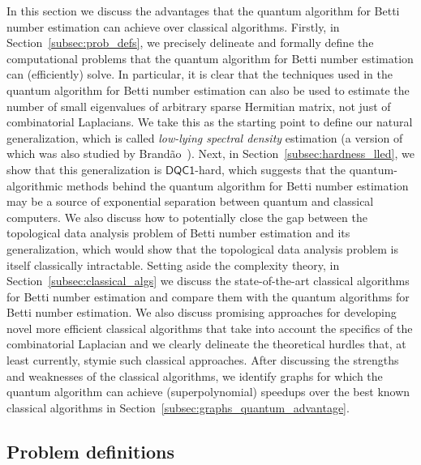 \documentclass[a4paper, onecolumn, accepted=2022-08-28]{quantumarticle}
\begin{document}
In this section we discuss the advantages that the quantum algorithm for Betti number estimation can achieve over classical algorithms.
Firstly, in Section~\ref{subsec:prob_defs}, we precisely delineate and formally define the computational problems that the quantum algorithm for Betti number estimation can (efficiently) solve.
In particular, it is clear that the techniques used in the quantum algorithm for Betti number estimation can also be used to estimate the number of small eigenvalues of arbitrary sparse Hermitian matrix, not just of combinatorial Laplacians.
We take this as the starting point to define our natural generalization, which is called \emph{low-lying spectral density} estimation (a version of which was also studied by Brand\~{a}o~\cite{brandao:thesis}).
Next, in Section~\ref{subsec:hardness_lled}, we show that this generalization is $\mathsf{DQC1}$-hard, which suggests that the quantum-algorithmic methods behind the quantum algorithm for Betti number estimation may be a source of exponential separation between quantum and classical computers.
We also discuss how to potentially close the gap between the topological data analysis problem of Betti number estimation and its generalization, which would show that the topological data analysis problem is itself classically intractable.
Setting aside the complexity theory, in Section~\ref{subsec:classical_algs} we discuss the state-of-the-art classical algorithms for Betti number estimation and compare them with the quantum algorithms for Betti number estimation.
We also discuss promising approaches for developing novel more efficient classical algorithms that take into account the specifics of the combinatorial Laplacian and we clearly delineate the theoretical hurdles that, at least currently, stymie such classical approaches.
After discussing the strengths and weaknesses of the classical algorithms, we identify graphs for which the quantum algorithm can achieve (superpolynomial) speedups over the best known classical algorithms in Section~\ref{subsec:graphs_quantum_advantage}.
\subsection{Problem definitions
\label{subsec:prob_defs}}
\end{document}
